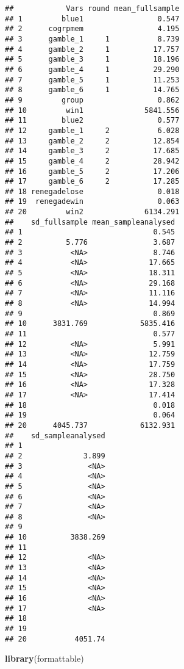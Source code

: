 \documentclass[]{tufte-handout}
\newenvironment{Shaded}{\begin{snugshade}}{\end{snugshade}}
\newcommand{\KeywordTok}[1]{\textcolor[rgb]{0.13,0.29,0.53}{\textbf{#1}}}
\newcommand{\NormalTok}[1]{#1}
\begin{document}
\begin{verbatim}
##            Vars round mean_fullsample
## 1         blue1                 0.547
## 2      cogrpmem                 4.195
## 3      gamble_1     1           8.739
## 4      gamble_2     1          17.757
## 5      gamble_3     1          18.196
## 6      gamble_4     1          29.290
## 7      gamble_5     1          11.253
## 8      gamble_6     1          14.765
## 9         group                 0.862
## 10         win1              5841.556
## 11        blue2                 0.577
## 12     gamble_1     2           6.028
## 13     gamble_2     2          12.854
## 14     gamble_3     2          17.685
## 15     gamble_4     2          28.942
## 16     gamble_5     2          17.206
## 17     gamble_6     2          17.285
## 18 renegadelose                 0.018
## 19  renegadewin                 0.063
## 20         win2              6134.291
##    sd_fullsample mean_sampleanalysed
## 1                              0.545
## 2          5.776               3.687
## 3           <NA>               8.746
## 4           <NA>              17.665
## 5           <NA>              18.311
## 6           <NA>              29.168
## 7           <NA>              11.116
## 8           <NA>              14.994
## 9                              0.869
## 10      3831.769            5835.416
## 11                             0.577
## 12          <NA>               5.991
## 13          <NA>              12.759
## 14          <NA>              17.759
## 15          <NA>              28.750
## 16          <NA>              17.328
## 17          <NA>              17.414
## 18                             0.018
## 19                             0.064
## 20      4045.737            6132.931
##    sd_sampleanalysed
## 1                   
## 2              3.899
## 3               <NA>
## 4               <NA>
## 5               <NA>
## 6               <NA>
## 7               <NA>
## 8               <NA>
## 9                   
## 10          3838.269
## 11                  
## 12              <NA>
## 13              <NA>
## 14              <NA>
## 15              <NA>
## 16              <NA>
## 17              <NA>
## 18                  
## 19                  
## 20           4051.74
\end{verbatim}

\begin{Shaded}
\begin{Highlighting}[]
\KeywordTok{library}\NormalTok{(formattable)}
\end{Highlighting}
\end{Shaded}
\end{document}
